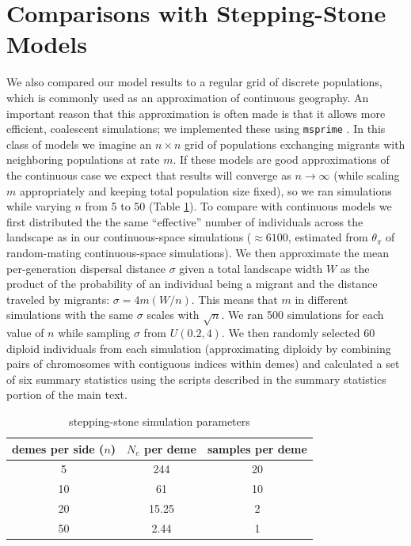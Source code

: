 \documentclass[10pt,twoside,lineno,hidelinks]{preprint}
\begin{document}
\section{Comparisons with Stepping-Stone Models}

We also compared our model results to a regular grid of discrete populations,
which is commonly used as an approximation of continuous geography.
An important reason that this approximation is often made
is that it allows more efficient, coalescent simulations;
we implemented these using \texttt{msprime} \citep{Kelleher2016}.
In this class of models we imagine an $n \times n$ grid of populations exchanging migrants with neighboring populations at rate $m$.
If these models are good approximations of the continuous case we expect that results
will converge as $n \to \infty$
(while scaling $m$ appropriately and keeping total population size fixed),
so we ran simulations while varying $n$ from 5 to 50 (Table \ref{table:grid_params}).
To compare with continuous models we first distributed the the same ``effective'' number of individuals across the landscape as in our continuous-space simulations ($\approx 6100$, estimated from $\theta_{\pi}$ of random-mating continuous-space simulations).
We then approximate the mean per-generation dispersal distance $\sigma$ given a total landscape width $W$ as the product of the probability of an individual being a migrant and the distance traveled by migrants: $\sigma = 4m(W/n)$.
This means that $m$ in different simulations with the same $\sigma$ scales with $\sqrt{n}$.
We ran 500 simulations for each value of $n$ while sampling $\sigma$ from $U(0.2,4)$. We then randomly selected 60 diploid individuals from each simulation (approximating diploidy by combining pairs of chromosomes with contiguous indices within demes) and calculated a set of six summary statistics using the scripts described in the summary statistics portion of the main text. 

\begin{table}[h]
\centering
\begin{tabular}{ccc}
     demes per side ($n$)&$N_e$ per deme  & samples per deme  \\
     \hline
     5 & 244 & 20 \\
     10 & 61 & 10 \\
     20 & 15.25 & 2 \\
     50 & 2.44 & 1 \\
\end{tabular}
\captionsetup{justification=centering}
\caption{stepping-stone simulation parameters}
\label{table:grid_params}
\end{table}
\end{document}
